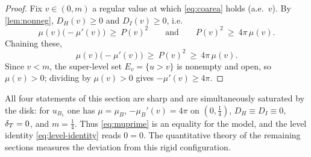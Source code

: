 \begin{proof}
Fix $v\in(0,m)$ a regular value at which \eqref{eq:coarea} holds (a.e.\ $v$).
By \cref{lem:nonneg}, $D_H(v)\ge0$ and $D_I(v)\ge0$, i.e.
\[
   \mu(v)\bigl(-\mu'(v)\bigr)\ \ge\ P(v)^2\qquad\text{and}\qquad
   P(v)^2\ \ge\ 4\pi\,\mu(v).
\]
Chaining these,
\[
   \mu(v)\bigl(-\mu'(v)\bigr)\ \ge\ P(v)^2\ \ge\ 4\pi\,\mu(v).
\]
Since $v<m$, the super-level set $E_v=\{u>v\}$ is nonempty and open, so
$\mu(v)>0$; dividing by $\mu(v)>0$ gives $-\mu'(v)\ge4\pi$.
\end{proof}

\begin{remark}\label{rem:sharp-mu}
All four statements of this section are sharp and are simultaneously
saturated by the disk: for $u_{B_1}$ one has $\mu=\mu_B$, $-\mu_B'(v)=4\pi$ on
$(0,\tfrac14)$, $D_H\equiv D_I\equiv0$, $\delta_T=0$, and $m=\tfrac14$. Thus
\eqref{eq:muprime} is an equality for the model, and the level identity
\eqref{eq:level-identity} reads $0=0$. The quantitative theory of the
remaining sections measures the deviation from this rigid configuration.
\end{remark}
